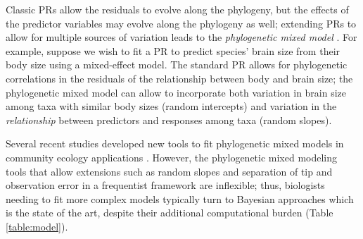 \documentclass[12pt]{article}
\begin{document}
Classic PRs allow the residuals to evolve along the phylogeny, but the effects of the predictor variables may evolve along the phylogeny as well; extending PRs to allow for multiple sources of variation leads to the  \emph{phylogenetic mixed model} \citep{housworth2004phylogenetic}.
For example, suppose we wish to fit a PR to predict species' brain size from their body size \cite{felsenstein1985phylogenies} using a mixed-effect model.
The standard PR allows for phylogenetic correlations in the residuals of the relationship between body and brain size; the phylogenetic mixed model can allow to incorporate both
variation in brain size among taxa with similar body sizes (random intercepts) and
variation in the \emph{relationship} between predictors and responses among taxa (random slopes).

Several recent studies developed new tools to fit phylogenetic mixed models in
community ecology applications \citep{nowakowski2018phylogenetic, li2017canfun}.
However, the phylogenetic mixed modeling tools that allow extensions such as random slopes
and separation of tip and observation error in a frequentist framework are inflexible; thus, biologists needing to fit more complex models typically turn to Bayesian approaches which is the state of the art, despite their additional computational burden \citep{hadfield2010mcmc, burkner2018brms, kostikova2016bridging} (Table \ref{table:model}).
\end{document}
